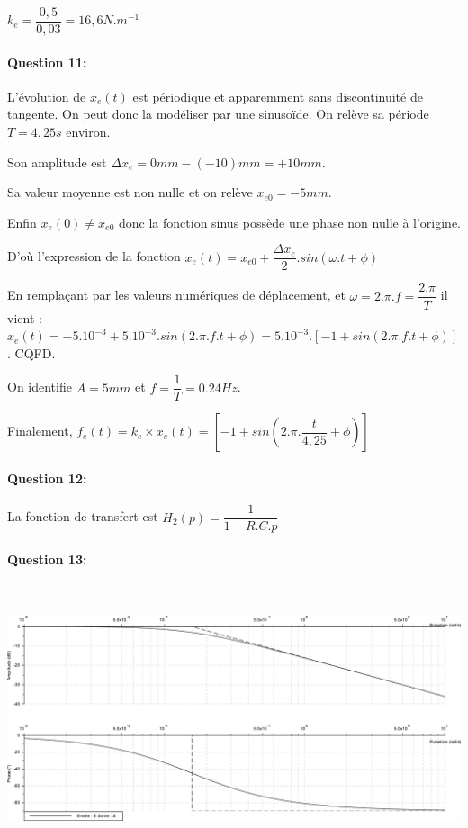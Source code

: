 $k_e=\dfrac{0,5}{0,03}=16,6N.m^{-1}$



\paragraph{Question 11:}

L'évolution de $x_e(t)$ est périodique et apparemment sans discontinuité de tangente. On peut donc la modéliser par une sinusoïde. On relève sa période $T=4,25s$ environ.

Son amplitude est  $\Delta x_e=0mm-(-10)mm=+10mm$.

Sa valeur moyenne est non nulle et on relève $x_{e0}=-5mm$.

Enfin $x_e(0)\neq x_{e0}$ donc la fonction sinus possède une phase non nulle à l'origine.

D'où l'expression de la fonction $x_e(t)=x_{e0}+\dfrac{\Delta x_e}{2}.sin(\omega.t+\phi)$

En remplaçant par les valeurs numériques de déplacement, et $\omega=2.\pi.f=\dfrac{2.\pi}{T}$ il vient : $x_e(t)=-5.10^{-3}+5.10^{-3}.sin(2.\pi.f.t+\phi)=5.10^{-3}.[-1+sin(2.\pi.f.t+\phi)]$. CQFD.

On identifie $A=5mm$ et $f=\dfrac{1}{T}=0.24Hz$.

Finalement, $f_e(t)=k_e\times x_e(t)=\left[-1+sin\left(2.\pi.\dfrac{t}{4,25}+\phi\right)\right]$

\paragraph{Question 12:}

La fonction de transfert est $H_2(p)=\dfrac{1}{1+R.C.p}$

\paragraph{Question 13:} ~\ \\

\begin{center}
 \includegraphics[width=0.7\linewidth]{img/Bode}
\end{center}


